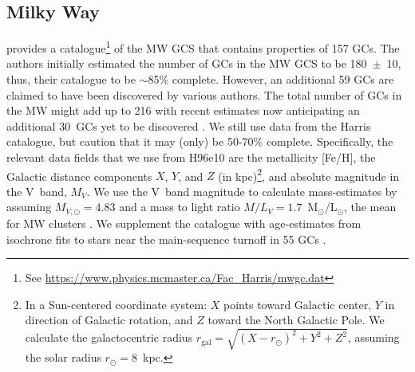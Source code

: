\documentclass[a4paper,fleqn,usenatbib]{mnras}
\begin{document}
\subsection{Milky Way}
\label{sec:milkyway}
\citet[][2010 edition; hereafter H96e10]{1996AJ....112.1487H} provides a
catalogue\footnote{See \url{https://www.physics.mcmaster.ca/Fac_Harris/mwgc.dat}}
of the MW GCS that contains properties of 157 GCs. 
The authors initially estimated the number of GCs in the MW GCS to be 180~$\pm$~10,
thus, their catalogue to be ${\sim}$85\% complete. However, an additional 59 GCs
are claimed to have been discovered by various authors. The total number of GCs
in the MW might add up to 216 with recent estimates now anticipating an additional 
$30$~GCs yet to be discovered \citep[e.g.][and references therein]{2018ApJ...863L..38R}.
We still use data from the Harris catalogue, but caution that it may (only) be
50-70\% complete. Specifically, the relevant data fields that we use from H96e10
are the metallicity [Fe/H], the Galactic distance components $X$, $Y$, and $Z$ (in
kpc)\footnote{In a Sun-centered coordinate system: $X$ points toward Galactic
center, $Y$ in direction of Galactic rotation, and $Z$ toward the North Galactic
Pole. We calculate the galactocentric radius $r_{\text{gal}}=\sqrt{(X-r_\odot)^2
+ Y^2 + Z^2}$, assuming the solar radius $r_\odot=8$~kpc.}, and absolute
magnitude in the V~band, $M_V$. We use the V~band magnitude to calculate 
mass-estimates by assuming $M_{V,\odot}=4.83$ and a mass to light ratio 
$M/L_V = 1.7$~M$_{\odot}$/L$_{\odot}$, the mean for MW clusters \citep{2005ApJS..161..304M}. 
We supplement the catalogue with age-estimates from isochrone fits to stars near 
the main-sequence turnoff in 55 GCs \citep[][hereafter V13]{2013ApJ...775..134V}.

\end{document}
